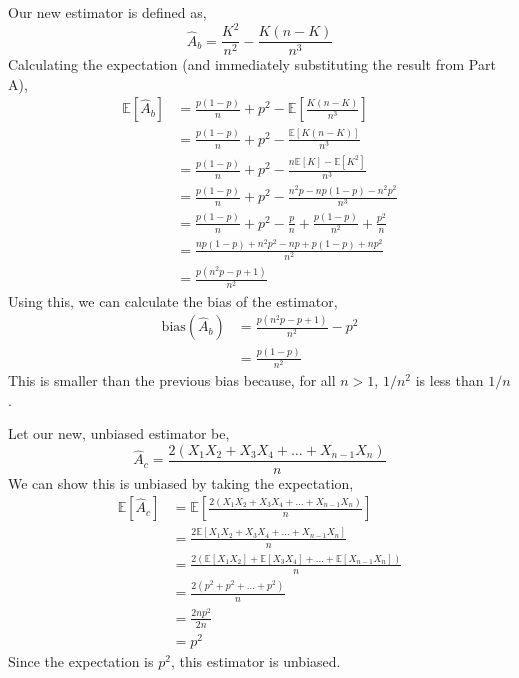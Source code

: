 \documentclass[12pt,twoside]{article}
\begin{document}
\begin{problems}
\begin{problemparts}
Our new estimator is defined as,
$$ \hat{A}_b = \frac{K^2}{n^2} - \frac{K (n - K)}{n^3} $$
Calculating the expectation (and immediately substituting the result
from Part A),
\begin{align*}
    \mathbb{E}[\hat{A}_b] &= \frac{p(1 - p)}{n} + p^2 - \mathbb{E}\left[\frac{K 
    (n - K)}{n^3}\right] \\
    &= \frac{p(1 - p)}{n} + p^2 - \frac{\mathbb{E}[K (n - K)]}{n^3} \\
    &= \frac{p(1 - p)}{n} + p^2 - \frac{n\mathbb{E}[K] - \mathbb{E}[K^2]}{n^3} \\
    &= \frac{p(1 - p)}{n} + p^2 - \frac{n^2 p - np(1 - p) - n^2 p^2}{n^3} \\
    &= \frac{p(1 - p)}{n} + p^2 - \frac{p}{n} +\frac{p(1 - p)}{n^2} + \frac{p^2}{n} \\
    &= \frac{np(1 - p) + n^2 p^2 - np + p(1 - p) + np^2}{n^2} \\
    &= \boxed{\frac{p(n^2 p - p + 1)}{n^2}}
\end{align*}
Using this, we can calculate the bias of the estimator,
\begin{align*}
    \mathrm{bias}(\hat{A}_b) &= \frac{p(n^2 p - p + 1)}{n^2} - p^2 \\
    &= \boxed{\frac{p (1 - p)}{n^2}}
\end{align*}
This is smaller than the previous bias because, for all $n > 1$, $1 / n^2$ is 
less than $1 / n$.

\problempart %

Let our new, unbiased estimator be,
$$ \hat{A}_c = \frac{2\left(X_1 X_2 + X_3 X_4 + \ldots + X_{n - 1} X_n\right)}
{n} $$
We can show this is unbiased by taking the expectation,
\begin{align*}
    \mathbb{E}[\hat{A}_c] &= \mathbb{E}\left[\frac{2\left(X_1 X_2 + X_3 X_4 + 
    \ldots + X_{n - 1} X_n\right)}{n}\right] \\
    &= \frac{2 \mathbb{E}[X_1 X_2 + X_3 X_4 + \ldots + X_{n - 1} X_n]}{n} \\
    &= \frac{2 \left(\mathbb{E}[X_1 X_2] + \mathbb{E}[X_3 X_4] + \ldots + 
    \mathbb{E}[X_{n - 1} X_n]\right)}{n} \\
    &= \frac{2 \left(p^2 + p^2 + \ldots + p^2\right)}{n} \\
    &= \frac{2 n p^2}{2n} \\
    &= \boxed{p^2}
\end{align*}
Since the expectation is $p^2$, this estimator is unbiased.


\end{problemparts}
\end{problems}
\end{document}
